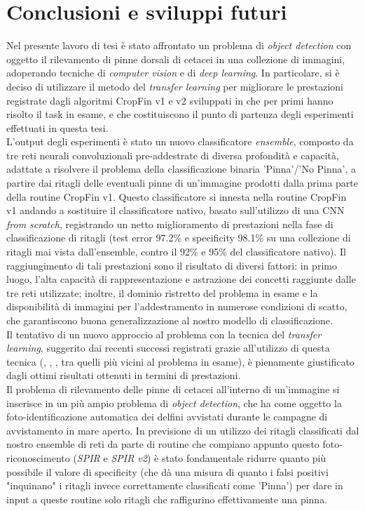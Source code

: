 \chapter{Conclusioni e sviluppi futuri}
Nel presente lavoro di tesi è stato affrontato un problema di \textit{object detection} con oggetto il rilevamento di pinne dorsali di cetacei in una collezione di immagini, adoperando tecniche di \textit{computer vision} e di \textit{deep learning}.
In particolare, si è deciso di utilizzare il metodo del \textit{transfer learning} per migliorare le prestazioni registrate dagli algoritmi CropFin v1 e v2 sviluppati in \cite{gianvito} che per primi hanno risolto il task in esame, e che costituiscono il punto di partenza degli esperimenti effettuati in questa tesi.\\

L'output degli esperimenti è stato un nuovo classificatore \textit{ensemble}, composto da tre reti neurali convoluzionali pre-addestrate di diversa profondità e capacità, adattate a risolvere il problema della classificazione binaria 'Pinna'/'No Pinna', a partire dai ritagli delle eventuali pinne di un'immagine prodotti dalla prima parte della routine CropFin v1. Questo classificatore si innesta nella routine CropFin v1 andando a sostituire il classificatore nativo, basato sull'utilizzo di una CNN \textit{from scratch}, registrando un netto miglioramento di prestazioni nella fase di classificazione di ritagli (test error 97.2\% e specificity 98.1\% su una collezione di ritagli mai vista dall'ensemble, contro il 92\% e 95\% del classificatore nativo). Il raggiungimento di tali prestazioni sono il risultato di diversi fattori: in primo luogo, l'alta capacità di rappresentazione e astrazione dei concetti raggiunte dalle tre reti utilizzate; inoltre, il dominio ristretto del problema in esame e la disponibilità di immagini per l'addestramento in numerose condizioni di scatto, che garantiscono buona generalizzazione al nostro modello di classificazione.\\

Il tentativo di un nuovo approccio al problema con la tecnica del \textit{transfer learning}, suggerito dai recenti successi registrati grazie all'utilizzo di questa tecnica (\cite{tl1}, \cite{tl2}, \cite{tl3}, tra quelli più vicini al problema in esame), è pienamente giustificato dagli ottimi risultati ottenuti in termini di prestazioni.\\

Il problema di rilevamento delle pinne di cetacei all'interno di un'immagine si inserisce in un più ampio problema di \textit{object detection}, che ha come oggetto la foto-identificazione automatica dei delfini avvistati durante le campagne di avvistamento in mare aperto. In previsione di un utilizzo dei ritagli classificati dal nostro ensemble di reti da parte di routine che compiano appunto questo foto-riconoscimento (\textit{SPIR} \cite{maglietta} e \textit{SPIR v2}\cite{emanuele}) è stato fondamentale ridurre quanto più possibile il valore di specificity (che dà una misura di quanto i falsi positivi "inquinano" i ritagli invece correttamente classificati come 'Pinna') per dare in input a queste routine solo ritagli che raffigurino effettivamente una pinna.\\

